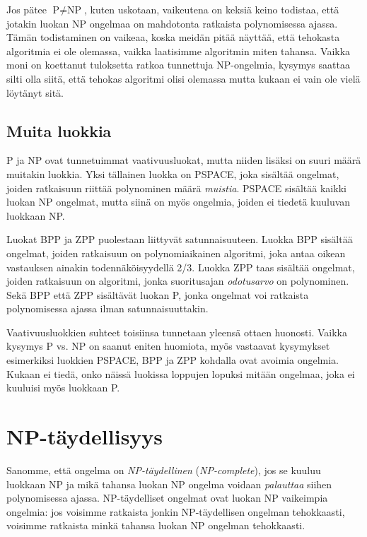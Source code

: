 Jos pätee $\textrm{P} \neq \textrm{NP}$, kuten uskotaan,
vaikeutena on keksiä keino todistaa, että jotakin
luokan NP ongelmaa on mahdotonta ratkaista
polynomisessa ajassa.
Tämän todistaminen on vaikeaa, koska meidän pitää näyttää,
että tehokasta algoritmia ei ole olemassa,
vaikka laatisimme algoritmin miten tahansa.
Vaikka moni on koettanut tuloksetta ratkoa
tunnettuja NP-ongelmia, kysymys saattaa silti olla siitä,
että tehokas algoritmi olisi olemassa mutta kukaan ei
vain ole vielä löytänyt sitä.

\subsection{Muita luokkia}


P ja NP ovat tunnetuimmat vaativuusluokat,
mutta niiden lisäksi on suuri määrä muitakin luokkia.
Yksi tällainen luokka on PSPACE,
joka sisältää ongelmat, joiden ratkaisuun riittää
polynominen määrä \emph{muistia}.
PSPACE sisältää kaikki luokan NP ongelmat,
mutta siinä on myös ongelmia,
joiden ei tiedetä kuuluvan luokkaan NP.


Luokat BPP ja ZPP puolestaan liittyvät satunnaisuuteen.
Luokka BPP sisältää ongelmat, joiden ratkaisuun on polynomiaikainen algoritmi,
joka antaa oikean vastauksen ainakin todennäköisyydellä 2/3.
Luokka ZPP taas sisältää ongelmat, joiden ratkaisuun on algoritmi,
jonka suoritusajan \emph{odotusarvo} on polynominen.
Sekä BPP että ZPP sisältävät luokan P, jonka ongelmat
voi ratkaista polynomisessa ajassa ilman satunnaisuuttakin.

Vaativuusluokkien suhteet toisiinsa tunnetaan yleensä ottaen huonosti.
Vaikka kysymys P vs. NP on saanut eniten huomiota,
myös vastaavat kysymykset esimerkiksi luokkien PSPACE, BPP ja ZPP
kohdalla ovat avoimia ongelmia.
Kukaan ei tiedä, onko näissä luokissa loppujen lopuksi mitään ongelmaa,
joka ei kuuluisi myös luokkaan P.

\section{NP-täydellisyys}


Sanomme, että ongelma on \emph{NP-täydellinen} (\emph{NP-complete}),
jos se kuuluu luokkaan NP ja mikä tahansa luokan NP
ongelma voidaan \emph{palauttaa} siihen polynomisessa ajassa.
NP-täydelliset ongelmat ovat luokan NP vaikeimpia ongelmia:
jos voisimme ratkaista jonkin NP-täydellisen ongelman tehokkaasti,
voisimme ratkaista minkä tahansa luokan NP ongelman tehokkaasti.

